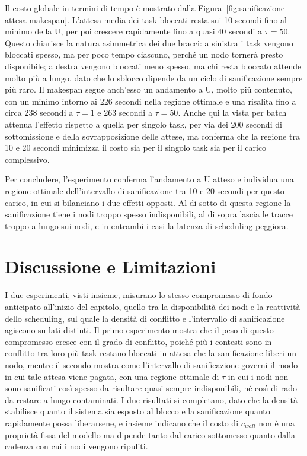Il costo globale in termini di tempo è mostrato dalla Figura~\ref{fig:sanificazione-attesa-makespan}. L'attesa media dei task bloccati resta sui 10 secondi fino al minimo della U, per poi crescere rapidamente fino a quasi 40 secondi a $\tau = 50$. Questo chiarisce la natura asimmetrica dei due bracci: a sinistra i task vengono bloccati spesso, ma per poco tempo ciascuno, perché un nodo tornerà presto disponibile; a destra vengono bloccati meno spesso, ma chi resta bloccato attende molto più a lungo, dato che lo sblocco dipende da un ciclo di sanificazione sempre più raro. Il makespan segue anch'esso un andamento a U, molto più contenuto, con un minimo intorno ai 226 secondi nella regione ottimale e una risalita fino a circa 238 secondi a $\tau = 1$ e 263 secondi a $\tau = 50$. Anche qui la vista per batch attenua l'effetto rispetto a quella per singolo task, per via dei 200 secondi di sottomissione e della sovrapposizione delle attese, ma conferma che la regione tra 10 e 20 secondi minimizza il costo sia per il singolo task sia per il carico complessivo.

Per concludere, l'esperimento conferma l'andamento a U atteso e individua una regione ottimale dell'intervallo di sanificazione tra 10 e 20 secondi per questo carico, in cui si bilanciano i due effetti opposti. Al di sotto di questa regione la sanificazione tiene i nodi troppo spesso indisponibili, al di sopra lascia le tracce troppo a lungo sui nodi, e in entrambi i casi la latenza di scheduling peggiora.


\section{Discussione e Limitazioni}
\label{sec:discussione_limitazioni}

I due esperimenti, visti insieme, misurano lo stesso compromesso di fondo anticipato all'inizio del capitolo, quello tra la disponibilità dei nodi e la reattività dello scheduling, sul quale la densità di conflitto e l'intervallo di sanificazione agiscono su lati distinti. Il primo esperimento mostra che il peso di questo compromesso cresce con il grado di conflitto, poiché più i contesti sono in conflitto tra loro più task restano bloccati in attesa che la sanificazione liberi un nodo, mentre il secondo mostra come l'intervallo di sanificazione governi il modo in cui tale attesa viene pagata, con una regione ottimale di $\tau$ in cui i nodi non sono sanificati così spesso da risultare quasi sempre indisponibili, né così di rado da restare a lungo contaminati. I due risultati si completano, dato che la densità stabilisce quanto il sistema sia esposto al blocco e la sanificazione quanto rapidamente possa liberarsene, e insieme indicano che il costo di $c_{wall}$ non è una proprietà fissa del modello ma dipende tanto dal carico sottomesso quanto dalla cadenza con cui i nodi vengono ripuliti.

